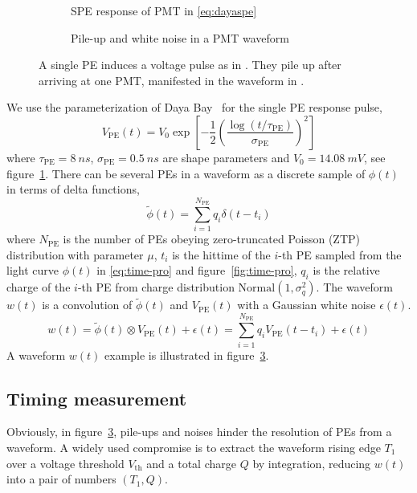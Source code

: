 \begin{figure}[H]
  \begin{subfigure}{.49\textwidth}
    \centering
    \resizebox{\textwidth}{!}{}
    \caption{\label{fig:spe} SPE response of PMT in \eqref{eq:dayaspe}}
  \end{subfigure}
  \begin{subfigure}{.49\textwidth}
    \centering
    \resizebox{\textwidth}{!}{}
    \caption{\label{fig:pile} Pile-up and white noise in a PMT waveform}
  \end{subfigure}
  \caption{A single PE induces a voltage pulse as in .  They pile up after arriving at one PMT, manifested in the waveform in .}
\end{figure}

We use the parameterization of Daya Bay~\cite{jetter_pmt_2012} for the single PE response pulse,
\begin{equation}
  V_\mathrm{PE}(t) = V_{0}\exp\left[-\frac{1}{2}\left(\frac{\log(t/\tau_\mathrm{PE})}{\sigma_\mathrm{PE}}\right)^{2}\right]
  \label{eq:dayaspe}
\end{equation}
where $\tau_\mathrm{PE}=\SI{8}{ns}$, $\sigma_\mathrm{PE}=\SI{0.5}{ns}$ are shape parameters and $V_{0}=\SI{14.08}{mV}$, see figure~\ref{fig:spe}.  There can be several PEs in a waveform as a discrete sample of $\phi(t)$ in terms of delta functions,
\begin{equation}
  \label{eq:lc-sample}
  \tilde{\phi}(t) = \sum_{i=1}^{N_{\mathrm{PE}}} q_i \delta(t-t_i)
\end{equation}
where $N_\mathrm{PE}$ is the number of PEs obeying zero-truncated Poisson (ZTP) distribution with parameter $\mu$, $t_i$ is the hittime of the $i$-th PE sampled from the light curve $\phi(t)$ in \eqref{eq:time-pro} and figure~\ref{fig:time-pro}, $q_i$ is the relative charge of the $i$-th PE from charge distribution $\mathrm{Normal}(1,\sigma_{q}^2)$.  The waveform $w(t)$ is a convolution of $\tilde{\phi}(t)$ and $V_\mathrm{PE}(t)$ with a Gaussian white noise $\epsilon(t)$.
\begin{equation}
  \label{eq:1}
  w(t) = \tilde{\phi}(t) \otimes V_\mathrm{PE}(t) + \epsilon(t) =  \sum_{i=1}^{N_\mathrm{PE}} q_i V_\mathrm{PE}(t-t_i) + \epsilon(t)
\end{equation}
A waveform $w(t)$ example is illustrated in figure~\ref{fig:pile}.

\subsection{Timing measurement}
Obviously, in figure~\ref{fig:pile}, pile-ups and noises hinder the resolution of PEs from a waveform.  A widely used compromise is to extract the waveform rising edge $T_1$ over a voltage threshold $V_\mathrm{th}$ and a total charge $Q$ by integration, reducing $w(t)$ into a pair of numbers $(T_1, Q)$.

